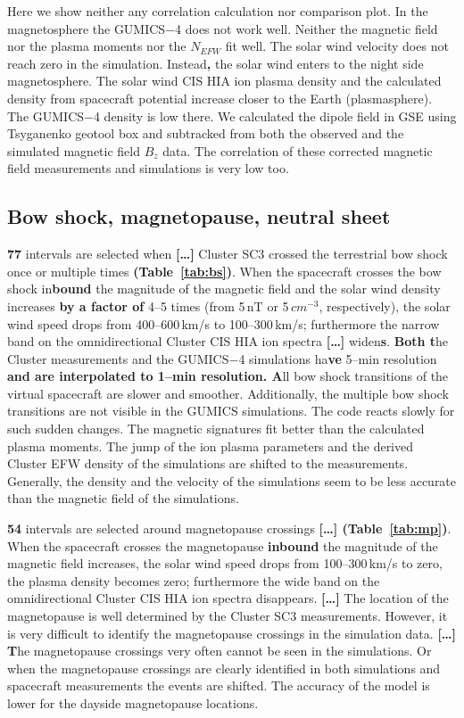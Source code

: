\documentclass[linenumbers,draft]{agujournal}
\begin{document}
Here we show neither any correlation calculation nor comparison plot. In the magnetosphere the GUMICS$-$4 does not work well. Neither the magnetic field nor the plasma moments nor the $N_{EFW}$ fit well. The solar wind velocity does not reach zero in the simulation. Instead\textbf{,} the solar wind enters to the night side magnetosphere. The solar wind CIS HIA ion plasma density and the calculated density from spacecraft potential increase closer to the Earth (plasmasphere). The GUMICS$-$4 density is low there. We calculated the dipole field in GSE using Tsyganenko geotool box \citep{tsyganenko95:_model_earth} and subtracked from both the observed and the simulated magnetic field $B_z$ data. The correlation of these corrected magnetic field measurements and simulations is very low too. 

\subsection{Bow shock, magnetopause, neutral sheet}
\label{sec:bs}

\textbf{77} intervals are selected when \textbf{[\dots]} Cluster SC3 crossed the terrestrial bow shock once or multiple times \textbf{(Table~\ref{tab:bs})}. When the spacecraft crosses the bow shock in\textbf{bound} the magnitude of the magnetic field and the solar wind density increases \textbf{by a factor of} 4--5 times (from 5\,nT or 5\,$cm^{-3}$, respectively), the solar wind speed drops from 400--600\,km/s to 100--300\,km/s; furthermore the narrow band on the omnidirectional Cluster CIS HIA ion spectra \textbf{[\dots]} widen\textbf{s}. \textbf{Both t}he Cluster measurements and the GUMICS$-$4 simulations ha\textbf{ve} 5--min resolution\textbf{ and are interpolated to 1--min resolution. A}ll bow shock transitions of the virtual spacecraft are slower and smoother. Additionally, the multiple bow shock transitions are not visible in the $\mathrm{GUMICS}$ simulations. The code reacts slowly for such sudden changes. The magnetic signatures fit better than the calculated plasma moments. The jump of the ion plasma parameters and the derived Cluster EFW density of the simulations are shifted to the measurements. Generally, the density and the velocity of the simulations seem to be less accurate than the magnetic field of the simulations.

\textbf{54} intervals are selected around magnetopause crossings \textbf{[\dots] (Table~\ref{tab:mp})}. When the spacecraft crosses the magnetopause \textbf{inbound} the magnitude of the magnetic field increases, the solar wind speed drops from 100--300\,km/s to zero, the plasma density becomes zero; furthermore the wide band on the omnidirectional Cluster CIS HIA ion spectra disappears. \textbf{[\dots]} The location of the magnetopause is well determined by the Cluster SC3 measurements. However, it is very difficult to identify the magnetopause crossings in the simulation data. \textbf{[\dots] T}he magnetopause crossings very often cannot be seen in the simulations. Or when the magnetopause crossings are clearly identified in both simulations and spacecraft measurements the events are shifted. The accuracy of the model is lower for the dayside magnetopause locations. 
\end{document}
